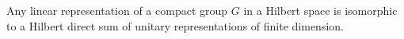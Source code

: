 Any linear representation of a compact group $G$ in a Hilbert space is isomorphic to a Hilbert direct sum of unitary representations of finite dimension.
